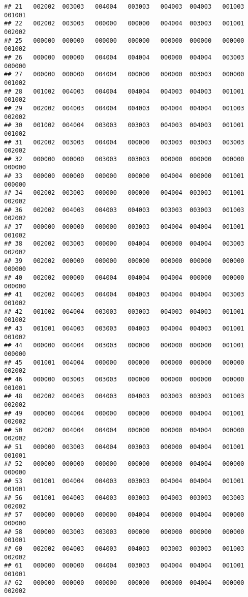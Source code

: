 \documentclass[
]{article}
\begin{document}
\begin{verbatim}
## 21   002002  003003   004004   003003   004003  004003   001003   001001
## 22   002002  003003   000000   000000   004004  003003   001001   002002
## 25   000000  000000   000000   000000   000000  000000   000000   001002
## 26   000000  000000   004004   004004   000000  004004   003003   000000
## 27   000000  000000   004004   000000   000000  003003   000000   001002
## 28   001002  004003   004004   004004   004003  004003   001001   001002
## 29   002002  004003   004004   004003   004004  004004   001003   002002
## 30   001002  004004   003003   003003   004003  004003   001001   001002
## 31   002002  003003   004004   000000   003003  003003   003003   002002
## 32   000000  000000   003003   003003   000000  000000   000000   000000
## 33   000000  000000   000000   000000   004004  000000   001001   000000
## 34   002002  003003   000000   000000   004004  003003   001001   002002
## 36   002002  004003   004003   004003   003003  003003   001003   002002
## 37   000000  000000   000000   003003   004004  004004   001001   001002
## 38   002002  003003   000000   004004   000000  004004   003003   002002
## 39   002002  000000   000000   000000   000000  000000   000000   000000
## 40   002002  000000   004004   004004   004004  000000   000000   000000
## 41   002002  004003   004004   004003   004004  004004   003003   001002
## 42   001002  004004   003003   003003   004003  004003   001001   001002
## 43   001001  004003   003003   004003   004004  004003   001001   001002
## 44   000000  004004   003003   000000   000000  000000   001001   000000
## 45   001001  004004   000000   000000   000000  000000   000000   002002
## 46   000000  003003   003003   000000   000000  000000   000000   001001
## 48   002002  004003   004003   004003   003003  003003   001003   002002
## 49   000000  004004   000000   000000   000000  004004   001001   002002
## 50   002002  004004   004004   000000   000000  004004   000000   002002
## 51   000000  003003   004004   003003   000000  004004   001001   001001
## 52   000000  000000   000000   000000   000000  004004   000000   000000
## 53   001001  004004   004003   003003   004004  004004   001001   001001
## 56   001001  004003   004003   003003   004003  003003   003003   002002
## 57   000000  000000   000000   004004   000000  004004   000000   000000
## 58   000000  003003   003003   000000   000000  000000   000000   001001
## 60   002002  004003   004003   004003   003003  003003   001003   002002
## 61   000000  000000   004004   003003   004004  004004   001001   001001
## 62   000000  000000   000000   000000   000000  004004   000000   002002

\end{verbatim}
\end{document}
